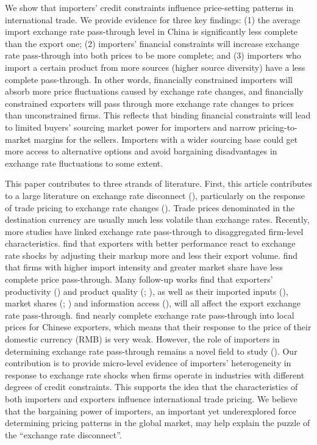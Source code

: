 \documentclass[12pt]{article}
\begin{document}
We show that importers' credit constraints influence price-setting patterns in international trade. We provide evidence for three key findings: (1) the average import exchange rate pass-through level in China is significantly less complete than the export one; (2) importers' financial constraints will increase exchange rate pass-through into both prices to be more complete; and (3) importers who import a certain product from more sources (higher source diversity) have a less complete pass-through. In other words, financially constrained importers will absorb more price fluctuations caused by exchange rate changes, and financially constrained exporters will pass through more exchange rate changes to prices than unconstrained firms. This reflects that binding financial constraints will lead to limited buyers' sourcing market power for importers and narrow pricing-to-market margins for the sellers. Importers with a wider sourcing base could get more access to alternative options and avoid bargaining disadvantages in exchange rate fluctuations to some extent.

This paper contributes to three strands of literature. First, this article contributes to a large literature on exchange rate disconnect (\cite{obstfeld2000}), particularly on the response of trade pricing to exchange rate changes (\cite{campa2005}). Trade prices denominated in the destination currency are usually much less volatile than exchange rates. Recently, more studies have linked exchange rate pass-through to disaggregated firm-level characteristics. \cite{bmm2012} find that exporters with better performance react to exchange rate shocks by adjusting their markup more and less their export volume. \cite{aik2014} find that firms with higher import intensity and greater market share have less complete price pass-through. Many follow-up works find that exporters' productivity (\cite{lmx2015}) and product quality (\cite{chen2016}; \cite{auer2018}), as well as their imported inputs (\cite{wang-yu2021}), market shares (\cite{auer2016}; \cite{devereux2017}) and information access (\cite{garetto2016}), will all affect the export exchange rate pass-through. \cite{lmx2015} find nearly complete exchange rate pass-through into local prices for Chinese exporters, which means that their response to the price of their domestic currency (RMB) is very weak. However, the role of importers in determining exchange rate pass-through remains a novel field to study (\cite{alviarez2023}). Our contribution is to provide micro-level evidence of importers' heterogeneity in response to exchange rate shocks when firms operate in industries with different degrees of credit constraints. This supports the idea that the characteristics of both importers and exporters influence international trade pricing. We believe that the bargaining power of importers, an important yet underexplored force determining pricing patterns in the global market, may help explain the puzzle of the ``exchange rate disconnect''. 
\end{document}
